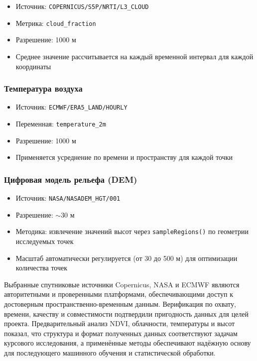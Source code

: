 \begin{itemize}
	\item Источник: \texttt{COPERNICUS/S5P/NRTI/L3\_CLOUD}
	\item Метрика: \texttt{cloud\_fraction}
	\item Разрешение: 1000 м
	\item Среднее значение рассчитывается на каждый временной интервал для каждой координаты
\end{itemize}

\subsubsection*{Температура воздуха}

\begin{itemize}
	\item Источник: \texttt{ECMWF/ERA5\_LAND/HOURLY}
	\item Переменная: \texttt{temperature\_2m}
	\item Разрешение: 1000 м
	\item Применяется усреднение по времени и пространству для каждой точки
\end{itemize}

\subsubsection*{Цифровая модель рельефа (DEM)}

\begin{itemize}
	\item Источник: \texttt{NASA/NASADEM\_HGT/001}
	\item Разрешение: $\sim$30 м
	\item Методика: извлечение значений высот через \texttt{sampleRegions()} по геометрии исследуемых точек
	\item Масштаб автоматически регулируется (от 30 до 500 м) для оптимизации количества точек
\end{itemize}

Выбранные спутниковые источники Copernicus, NASA и ECMWF являются авторитетными и проверенными платформами, обеспечивающими доступ к достоверным пространственно-временным данным. Верификация по охвату, времени, качеству и совместимости подтвердили пригодность данных для целей проекта. Предварительный анализ NDVI, облачности, температуры и высот показал, что структура и формат полученных данных соответствуют задачам курсового исследования, а применённые методы обеспечивают надёжную основу для последующего машинного обучения и статистической обработки.
